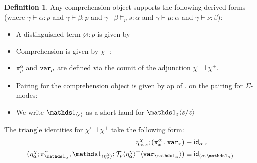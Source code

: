 \documentclass[10pt]{article}
\theoremstyle{definition}
\newtheorem{definition}{Definition}
\let\emptyset\varnothing
\newcommand\dsd[1]{\ensuremath{\mathsf{#1}}}
\newcommand{\yields}{\vdash}
\newcommand{\app}[2]{\ensuremath{#1 \: #2}}
\newcommand{\fst}[1]{\app{\dsd{fst}}{#1}}
\newcommand{\snd}[1]{\app{\dsd{snd}}{#1}}
\newcommand{\id}{\mathsf{id}}
\newcommand\TermTwoT[5]{\ensuremath{#1 \mid #3 \vDash_{#5} {#2} : #4}}
\newcommand\TrPlus[2]{\ensuremath{{#1}^+(#2)}}
\newcommand\El[2]{\mathcal{T}_{#1}(#2)}
\newcommand\ApEl[2]{\mathcal{T}_{#1}\langle#2\rangle}
\newcommand\bdot[0]{\mathbin{.}}
\newcommand\ap[2]{\ensuremath{#1 \langle #2 \rangle }}
\newcommand\ApPlus[2]{\ensuremath{{#1}^+ \langle #2 \rangle }}
\begin{document}
\begin{definition}
Any comprehension object supports the following derived forms (where $\gamma \yields \alpha : p$
and $\gamma \yields \beta : p$ and
$\TermTwoT{\gamma}{s}{\beta}{\alpha}{p}$ and $\gamma \yields \mu :
\alpha$ and $\gamma \yields \nu : \beta$):
  \begin{itemize}
  \item A distinguished term $\emptyset : p$ is given by
  \item Comprehension is given by $\chi^+$:
  \item $\pi^\alpha_\mu$ and $\mathtt{var}_{\mu}$ are defined via the counit of the adjunction $\chi^\circ \dashv \chi^+$.
  \item Pairing for the comprehension object is given by ap of
  $.$ on the pairing for $\Sigma$-modes:
  \item We write $\ApOne{s}$ as a short hand for $\ap{\One_z}{s/z}$
  \end{itemize}
\end{definition}

The triangle identities for $\chi^\circ \dashv \chi^+$ take the following form:
\begin{align}
\eta^\chi_{\alpha.x};(\pi_x^\alpha \bdot \var{x}) &\equiv \id_{\alpha.x} \\
(\eta^\chi_\alpha ; \pi^\alpha_{\One_\alpha}, \ApOne{\eta^\chi_\alpha} ; \ApPlus{\ApEl{p}{\eta^\chi_\alpha}}{\var{\One_\alpha}}) &\equiv \id_{(\alpha, \One_\alpha)}
\end{align}
\end{document}
